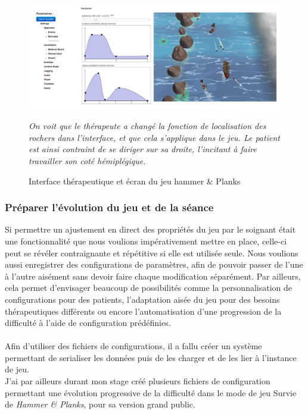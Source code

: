 \begin{figure}[!hbtp]
	\centering
	\includegraphics[width=16cm]{images/comparatif_interface_rochers.png}
	\caption{Interface thérapeutique et écran du jeu hammer \& Planks}
\emph{	On voit que le thérapeute a changé la fonction de localisation des rochers dans l'interface, et que cela s'applique dans le jeu. Le patient est ainsi contraint de se diriger sur sa droite, l'incitant à faire travailler son coté hémiplégique.}
	\label{comparatif_interface_rochers}
\end{figure}

	\subsubsection*{Préparer l'évolution du jeu et de la séance}
Si permettre un ajustement en direct des propriétés du jeu par le soignant était une fonctionnalité que nous voulions impérativement mettre en place, celle-ci peut se révéler contraignante et répétitive si elle est utilisée seule. Nous voulions aussi enregistrer des configurations de paramètres, afin de pouvoir passer de l'une à l'autre aisément sans devoir faire chaque modification séparément. Par ailleurs, cela permet d'envisager beaucoup de possibilités comme la personnalisation de configurations pour des patients, l'adaptation aisée du jeu pour des besoins thérapeutiques différents ou encore l'automatisation d'une progression de la difficulté à l'aide de configuration prédéfinies.

\paragraph{}Afin d'utiliser des fichiers de configurations, il a fallu créer un système permettant de serialiser les données puis de les charger et de les lier à l'instance de jeu.\\
J'ai par ailleurs durant mon stage créé plusieurs fichiers de configuration permettant une évolution progressive de la difficulté dans le mode de jeu Survie de \emph{Hammer \& Planks}, pour sa version grand public.

